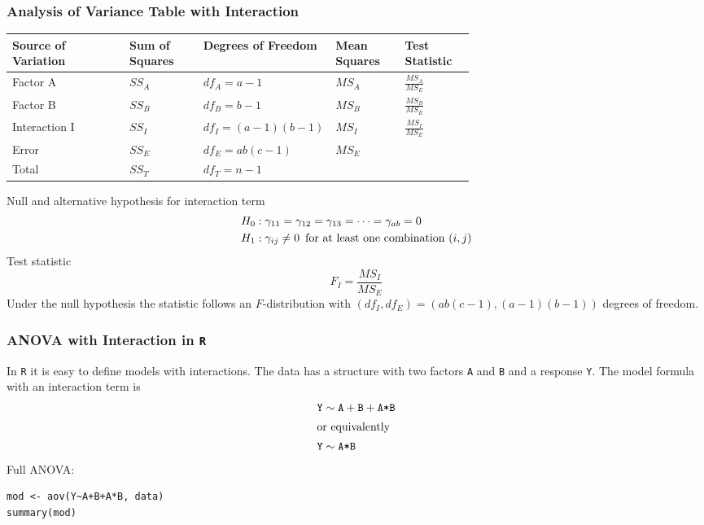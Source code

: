 \documentclass[11pt]{article}
\theoremstyle{definition}
\begin{document}
\subsubsection{Analysis of Variance Table with Interaction}
\begingroup
\renewcommand{\arraystretch}{1.6}
\begin{tabularx}{\linewidth}{X | p{0.16\linewidth} p{0.2\linewidth} p{0.15\linewidth} p{0.15\linewidth}}
	Source of Variation & Sum of Squares & Degrees of Freedom & Mean Squares & Test Statistic\\
	\hline
	Factor A & $SS_A$ & $df_A = a-1$ & $MS_A$ & $\frac{MS_A}{MS_E}$\\
	Factor B & $SS_B$ & $df_B = b-1$ & $MS_B$ & $\frac{MS_B}{MS_E}$\\
	Interaction I & $SS_I$ & $df_I = (a-1)(b-1)$ & $MS_I$ & $\frac{MS_I}{MS_E}$\\
	Error & $SS_E$ & $df_E = ab(c-1)$ & $MS_E$ & \\
	\hline
	Total & $SS_T$ & $df_T = n-1$ & &
\end{tabularx}
\endgroup
Null and alternative hypothesis for interaction term
\begin{align*}
	H_0 &: \gamma_{11} = \gamma_{12} = \gamma_{13} = \dots = \gamma_{ab} =0\\
	H_1 &: \gamma_{ij}\neq0\hspace*{0.5em}\text{for at least one combination $(i,j)$}
\end{align*}
Test statistic
\begin{equation*}
	F_I = \frac{MS_I}{MS_E}
\end{equation*}
Under the null hypothesis the statistic follows an $F$-distribution with $(df_I,df_E ) = \left(ab(c - 1),(a-1)(b-1)\right)$ degrees of freedom.

\subsubsection{ANOVA with Interaction in \texttt{R}}
In \texttt{R} it is easy to define models with interactions. The data has a structure with two factors \texttt{A} and \texttt{B} and a response \texttt{Y}. The model formula with an interaction term is
\begin{align*}
	\texttt{Y} &\sim \texttt{A} + \texttt{B} + \texttt{A*B}\\
	\intertext{or equivalently}
	\texttt{Y} &\sim \texttt{A*B}
\end{align*}
Full ANOVA:
\begin{verbatim}
mod <- aov(Y~A+B+A*B, data)
summary(mod)
\end{verbatim}
\end{document}
